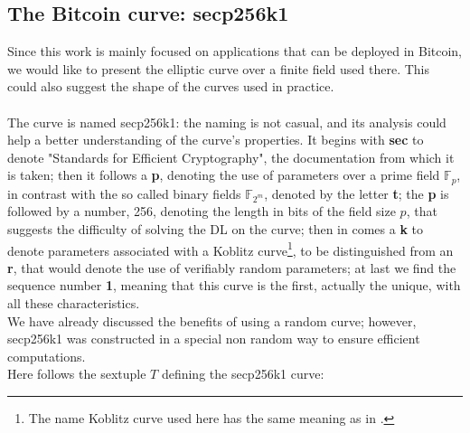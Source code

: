 \bigskip

\subsection{The Bitcoin curve: secp256k1}
\label{btccurve}
Since this work is mainly focused on applications that can be deployed in Bitcoin, we would like to present the elliptic curve over a finite field used there. This could also suggest the shape of the curves used in practice.
\\
\\
The curve is named secp256k1: the naming is not casual, and its analysis could help a better understanding of the curve's properties. It begins with {\bf sec} to denote "Standards for Efficient Cryptography", the documentation from which it is taken; then it follows a {\bf p}, denoting the use of parameters over a prime field $\mathbb{F}_p$, in contrast with the so called binary fields $\mathbb{F}_{2^m}$, denoted by the letter {\bf t}; the {\bf p} is followed by a number, 256, denoting the length in bits of the field size $p$, that suggests the difficulty of solving the DL on the curve; then in comes a {\bf k} to denote parameters associated with a Koblitz curve\footnote{The name Koblitz curve used here has the same meaning as in \cite{RefWork:3}.}, to be distinguished from an {\bf r}, that would denote the use of verifiably random parameters; at last we find the sequence number {\bf 1}, meaning that this curve is the first, actually the unique, with all these characteristics.
\\
We have already discussed the benefits of using a random curve; however, secp256k1 was constructed in a special non random way to ensure efficient computations.
\\
Here follows the sextuple $T$ defining the secp256k1 curve:
